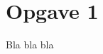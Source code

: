 \documentclass{article}
\begin{document}
\pagestyle{fancy}



\section{Opgave 1}
Bla bla bla 
\end{document}
